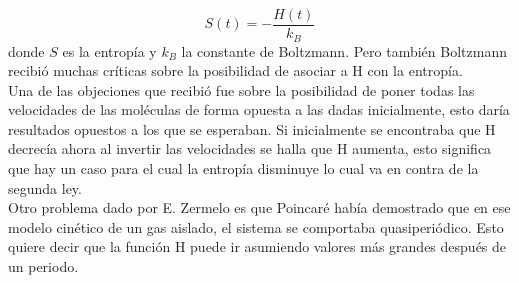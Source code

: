 \begin{equation}
S(t)=- \frac{H(t)}{k_{B}}
\end{equation}
donde $S$ es la entropía y $k_{B}$ la constante de Boltzmann. Pero también Boltzmann recibió muchas críticas sobre  la posibilidad de asociar a H con la entropía.
\\
Una de las objeciones que recibió fue sobre la posibilidad de poner todas las velocidades de las moléculas de forma opuesta a las dadas inicialmente, esto daría resultados opuestos a los que se esperaban. Si inicialmente se encontraba que H decrecía ahora al invertir las velocidades se halla que H aumenta, esto significa que hay un caso para el cual la entropía disminuye lo cual va en contra de la segunda ley. 
\\
Otro problema dado por E. Zermelo es que Poincaré había demostrado que en ese modelo cinético de un gas aislado, el sistema se comportaba quasiperiódico. Esto quiere decir que la función H puede ir asumiendo valores más grandes después de un periodo. 
\\
